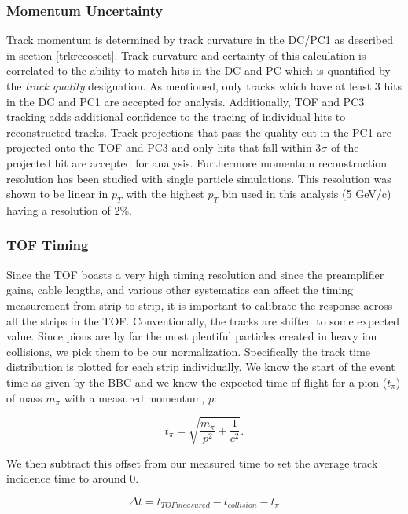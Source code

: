 \subsubsection{Momentum Uncertainty}
Track momentum is determined by track curvature in the DC/PC1 as described in section \ref{trkrecosect}. Track curvature and certainty of this calculation is correlated to the ability to match hits in the DC and PC which is quantified by the \textit{track quality} designation. As mentioned, only tracks which have at least 3 hits in the DC and PC1 are accepted for analysis. Additionally, TOF and PC3 tracking adds additional confidence to the tracing of individual hits to reconstructed tracks. Track projections that pass the quality cut in the PC1 are projected onto the TOF and PC3 and only hits that fall within $3\sigma$ of the projected hit are accepted for analysis. Furthermore momentum reconstruction resolution has been studied with single particle simulations\citep{Mitchell:2002wu}. This resolution was shown to be linear in $p_T$ with the highest $p_T$ bin used in this analysis (5 GeV/c) having a resolution of 2\%.
 
\subsubsection{TOF Timing}
Since the TOF boasts a very high timing resolution and since the preamplifier gains, cable lengths, and various other systematics can affect the timing measurement from strip to strip, it is important to calibrate the response across all the strips in the TOF. Conventionally, the tracks are shifted to some expected value. Since pions are by far the most plentiful particles created in heavy ion collisions, we pick them to be our normalization. Specifically the track time distribution is plotted for each strip individually. We know the start of the event time as given by the BBC and we know the expected time of flight for a pion ($t_{\pi}$) of mass $m_{\pi}$ with a measured momentum, $p$:

\begin{equation}
t_{\pi} = \sqrt{\frac{m_{\pi}}{p^2} + \frac{1}{c^2}}.
\end{equation}

We then subtract this offset from our measured time to set the average track incidence time to around 0.

\begin{equation}
\Delta t = t_{TOF measured} - t_{collision} - t_{\pi} 
\end{equation}
 
